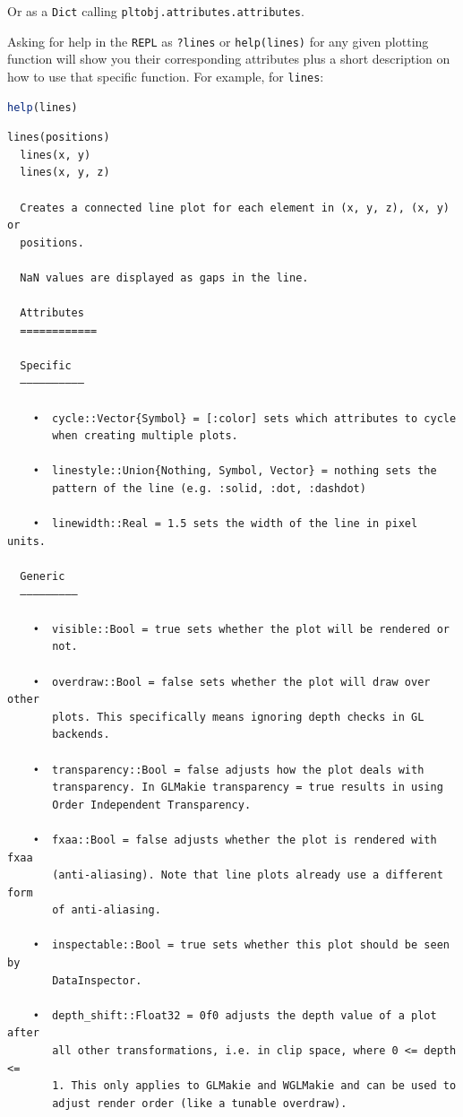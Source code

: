 \documentclass[
  notoc %
]{tufte-book}
\newcommand{\passthrough}[1]{#1}
\begin{document}
Or as a \passthrough{\lstinline!Dict!} calling
\passthrough{\lstinline!pltobj.attributes.attributes!}.

Asking for help in the \passthrough{\lstinline!REPL!} as
\passthrough{\lstinline!?lines!} or
\passthrough{\lstinline!help(lines)!} for any given plotting function
will show you their corresponding attributes plus a short description on
how to use that specific function. For example, for
\passthrough{\lstinline!lines!}:

\begin{lstlisting}[language=Julia]
help(lines)
\end{lstlisting}

\begin{lstlisting}[language=Output]
  lines(positions)
  lines(x, y)
  lines(x, y, z)

  Creates a connected line plot for each element in (x, y, z), (x, y) or
  positions.

  NaN values are displayed as gaps in the line.

  Attributes
  ============

  Specific
  ––––––––––

    •  cycle::Vector{Symbol} = [:color] sets which attributes to cycle
       when creating multiple plots.

    •  linestyle::Union{Nothing, Symbol, Vector} = nothing sets the
       pattern of the line (e.g. :solid, :dot, :dashdot)

    •  linewidth::Real = 1.5 sets the width of the line in pixel units.

  Generic
  –––––––––

    •  visible::Bool = true sets whether the plot will be rendered or
       not.

    •  overdraw::Bool = false sets whether the plot will draw over other
       plots. This specifically means ignoring depth checks in GL
       backends.

    •  transparency::Bool = false adjusts how the plot deals with
       transparency. In GLMakie transparency = true results in using
       Order Independent Transparency.

    •  fxaa::Bool = false adjusts whether the plot is rendered with fxaa
       (anti-aliasing). Note that line plots already use a different form
       of anti-aliasing.

    •  inspectable::Bool = true sets whether this plot should be seen by
       DataInspector.

    •  depth_shift::Float32 = 0f0 adjusts the depth value of a plot after
       all other transformations, i.e. in clip space, where 0 <= depth <=
       1. This only applies to GLMakie and WGLMakie and can be used to
       adjust render order (like a tunable overdraw).


\end{lstlisting}
\end{document}
